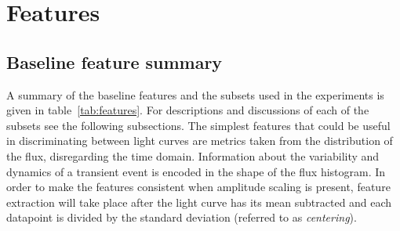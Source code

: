 \documentclass[10pt]{report}
\begin{document}
	
	\section{Features}
	\label{sec:features}
	\subsection{Baseline feature summary}
	A summary of the baseline features and the subsets used in the experiments is given in table~\ref{tab:features}. For descriptions and discussions of each of the subsets see the following subsections. 
	The simplest features that could be useful in discriminating between light curves are metrics taken from the distribution of the flux, disregarding the time domain. Information about the variability and dynamics of a transient event is encoded in the shape of the flux histogram. In order to make the features consistent when amplitude scaling is present, feature extraction will take place after the light curve has its mean subtracted and each datapoint is divided by the standard deviation (referred to as \emph{centering}).
	
\end{document}
